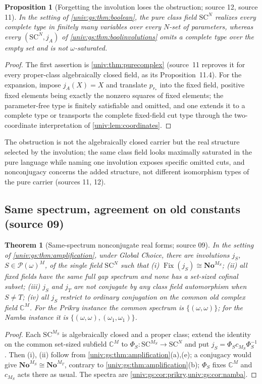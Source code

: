 \documentclass[11pt,letterpaper]{article}
\numberwithin{equation}{section}
\newtheorem{theorem}{Theorem}[section]
\newtheorem{proposition}[proposition]{Proposition}
\theoremstyle{definition}
\theoremstyle{remark}
\newcommand{\No}{\mathbf{No}}
\newcommand{\SC}{\mathrm{SC}}
\newcommand{\SCN}{\SC^{N}}
\newcommand{\C}{\mathbb C}
\newcommand{\Pow}{\mathcal P}
\newcommand{\Fix}{\operatorname{Fix}}
\begin{document}
\begin{proposition}[Forgetting the involution loses the obstruction; source 12, source 11]\label{univ:gs:prop:pureacf}
In the setting of \cref{univ:gs:thm:boolean}, the pure class field $\SCN$ realizes every
complete type in finitely many variables over every $N$-set of parameters, whereas every
$(\SCN,j_A)$ of \cref{univ:gs:thm:boolinvolutions} omits a complete type over the empty set and is
not $\omega$-saturated.
\end{proposition}
\begin{proof}
The first assertion is \cref{univ:thm:purecomplex} (source~11 reproves it for every proper-class
algebraically closed field, as its Proposition~11.4). For the expansion, impose $j_A(X)=X$ and
translate $p_{r_*}$ into the fixed field, positive fixed elements being exactly the nonzero squares
of fixed elements; the parameter-free type is finitely satisfiable and omitted, and one extends it
to a complete type or transports the complete fixed-field cut type through the two-coordinate
interpretation of \cref{univ:lem:coordinates}.
\end{proof}

The obstruction is not the algebraically closed carrier but the real structure selected by the
involution; the same class field looks maximally saturated in the pure language while naming one
involution exposes specific omitted cuts, and nonconjugacy concerns the added structure, not
different isomorphism types of the pure carrier (sources 11, 12).

\subsection{Same spectrum, agreement on old constants (source 09)}

\begin{theorem}[Same-spectrum nonconjugate real forms; source 09]\label{univ:gs:thm:ampinvolutions}
In the setting of \cref{univ:gs:thm:amplification}, under Global Choice, there are involutions
$j_S$, $S\in\Pow(\omega)^M$, of the single field $\SCN$ such that (i) $\Fix(j_S)\cong\No^{M_S}$;
(ii) all fixed fields have the same full gap spectrum and none has a set-sized cofinal subset;
(iii) $j_S$ and $j_T$ are not conjugate by any class field automorphism when $S\ne T$; (iv) all
$j_S$ restrict to ordinary conjugation on the common old complex field $\C^M$. For the Prikry
instance the common spectrum is $\{(\omega,\omega)\}$; for the Namba instance it is
$\{(\omega,\omega),(\omega_1,\omega_1)\}$.
\end{theorem}
\begin{proof}
Each $\SC^{M_S}$ is algebraically closed and a proper class; extend the identity on the common
set-sized subfield $\C^M$ to $\Phi_S:\SC^{M_S}\to\SCN$ and put $j_S=\Phi_Sc_{M_S}\Phi_S^{-1}$. Then
(i), (ii) follow from \cref{univ:gs:thm:amplification}(a),(e); a conjugacy would give
$\No^{M_S}\cong\No^{M_T}$, contrary to \cref{univ:gs:thm:amplification}(b); $\Phi_S$ fixes $\C^M$
and $c_{M_S}$ acts there as usual. The spectra are \cref{univ:gs:cor:prikry,univ:gs:cor:namba}.
\end{proof}
\end{document}

